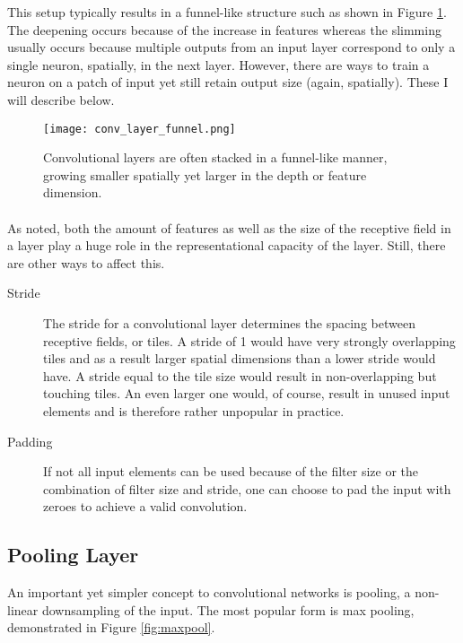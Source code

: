 This setup typically results in a funnel-like structure
such as shown in Figure \ref{fig:conv_layer_funnel}.
The deepening occurs because of the increase in features
whereas the slimming usually occurs because multiple
outputs from an input layer correspond to only a single
neuron, spatially, in the next layer.
However, there are ways to train a neuron on a patch of input
yet still retain output size (again, spatially).
These I will describe below.

\begin{figure}[htpb]
  \centering
  \texttt{[image: conv\_layer\_funnel.png]}
  \caption{Convolutional layers are often stacked
    in a funnel-like manner,
    growing smaller spatially
    yet larger in the depth or feature dimension.
  }
  \label{fig:conv_layer_funnel}
\end{figure}

\paragraph{}
As noted, both the amount of features
as well as the size of the receptive field in a layer
play a huge role in the representational capacity of the layer.
Still, there are other ways to affect this.
\begin{description}
  \item[Stride]
    The stride for a convolutional layer determines the spacing
    between receptive fields, or tiles.
    A stride of 1 would have very strongly overlapping tiles
    and as a result larger spatial dimensions
    than a lower stride would have.
    A stride equal to the tile size
    would result in non-overlapping but touching tiles.
    An even larger one would, of course,
    result in unused input elements and is therefore
    rather unpopular in practice.
  \item[Padding]
    If not all input elements can be used
    because of the filter size or the combination
    of filter size and stride,
    one can choose to pad the input with zeroes
    to achieve a valid convolution.
\end{description}

\subsection{Pooling Layer}
An important yet simpler concept to
convolutional networks is pooling,
a non-linear downsampling of the input.
The most popular form is max pooling,
demonstrated in Figure \ref{fig:maxpool}.

